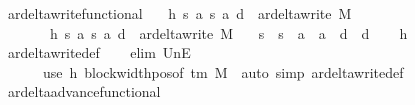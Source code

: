 \begin{isabellebody}
\endisatagproof
{\isafoldproof}%
%
\isadelimproof
\isanewline
%
\endisadelimproof
\isanewline
{}\isamarkupfalse%
\ ar{\isacharunderscore}{\kern0pt}delta{\isacharunderscore}{\kern0pt}write{\isacharunderscore}{\kern0pt}functional{\isacharcolon}{\kern0pt}\isanewline
\ \ \ h{}{\isacharcolon}{\kern0pt}\ {\isachardoublequoteopen}{\isacharparenleft}{\kern0pt}s{\isacharcomma}{\kern0pt}\ a{\isacharcomma}{\kern0pt}\ s{}{\isacharcomma}{\kern0pt}\ a{}{\isacharcomma}{\kern0pt}\ d{}{\isacharparenright}{\kern0pt}\ {\isasymin}\ ar{\isacharunderscore}{\kern0pt}delta{\isacharunderscore}{\kern0pt}write\ M{\isachardoublequoteclose}\isanewline
\ \ \ \ \ \ \ h{}{\isacharcolon}{\kern0pt}\ {\isachardoublequoteopen}{\isacharparenleft}{\kern0pt}s{\isacharcomma}{\kern0pt}\ a{\isacharcomma}{\kern0pt}\ s{}{\isacharcomma}{\kern0pt}\ a{}{\isacharcomma}{\kern0pt}\ d{}{\isacharparenright}{\kern0pt}\ {\isasymin}\ ar{\isacharunderscore}{\kern0pt}delta{\isacharunderscore}{\kern0pt}write\ M{\isachardoublequoteclose}\isanewline
\ \ \ {\isachardoublequoteopen}s{}\ {\isacharequal}{\kern0pt}\ s{}\ {\isasymand}\ a{}\ {\isacharequal}{\kern0pt}\ a{}\ {\isasymand}\ d{}\ {\isacharequal}{\kern0pt}\ d{}{\isachardoublequoteclose}\isanewline
%
\isadelimproof
\ \ %
\endisadelimproof
%
\isatagproof
{}\isamarkupfalse%
\ h{}\ \isamarkupfalse%
\ ar{\isacharunderscore}{\kern0pt}delta{\isacharunderscore}{\kern0pt}write{\isacharunderscore}{\kern0pt}def\isanewline
\ \ \isamarkupfalse%
\ {\isacharparenleft}{\kern0pt}elim\ UnE{\isacharsemicolon}{\kern0pt}\isanewline
\ \ \ \ \ \ use\ h{}\ block{\isacharunderscore}{\kern0pt}width{\isacharunderscore}{\kern0pt}pos{\isacharbrackleft}{\kern0pt}of\ {\isachardoublequoteopen}{\isasymGamma}{\isacharunderscore}{\kern0pt}tm\ M{\isachardoublequoteclose}{\isacharbrackright}{\kern0pt}\ \ {\isacartoucheopen}auto\ simp{\isacharcolon}{\kern0pt}\ ar{\isacharunderscore}{\kern0pt}delta{\isacharunderscore}{\kern0pt}write{\isacharunderscore}{\kern0pt}def{\isacartoucheclose}{\isacharparenright}{\kern0pt}%
\endisatagproof
{\isafoldproof}%
%
\isadelimproof
\isanewline
%
\endisadelimproof
\isanewline
{}\isamarkupfalse%
\ ar{\isacharunderscore}{\kern0pt}delta{\isacharunderscore}{\kern0pt}advance{\isacharunderscore}{\kern0pt}functional{\isacharcolon}{\kern0pt}\isanewline

\end{isabellebody}
